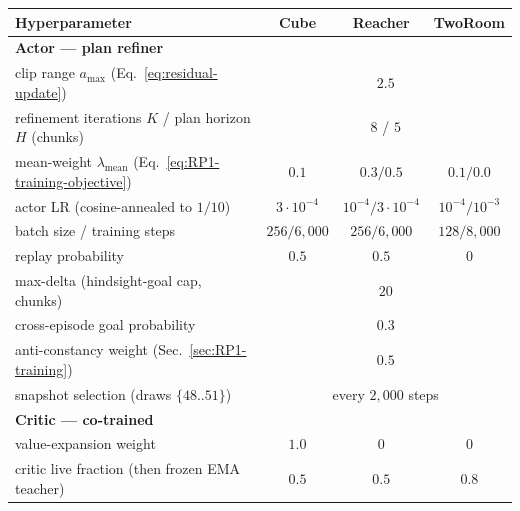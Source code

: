 \begin{table}[H]
\centering
\footnotesize
\renewcommand{\arraystretch}{1.22}
\setlength{\tabcolsep}{7pt}
\begin{tabular}{@{}l@{\hspace{1.5em}}ccc@{}}
\toprule
\textbf{Hyperparameter} & \textbf{Cube} & \textbf{Reacher} & \textbf{TwoRoom}\\
\midrule
\textbf{Actor --- plan refiner}\\
clip range $a_{\max}$ (Eq.~\ref{eq:residual-update})       & \multicolumn{3}{c}{$2.5$}\\
refinement iterations $K$ / plan horizon $H$ (chunks)      & \multicolumn{3}{c}{$8$ / $5$}\\
mean-weight $\lambda_{\mathrm{mean}}$ (Eq.~\ref{eq:RP1-training-objective}) & $0.1$ & $0.3/0.5$ & $0.1/0.0$\\
actor LR (cosine-annealed to $1/10$)                       & $3{\cdot}10^{-4}$ & $10^{-4}/3{\cdot}10^{-4}$ & $10^{-4}/10^{-3}$\\
batch size / training steps                                & $256/6{,}000$ & $256/6{,}000$ & $128/8{,}000$\\
replay probability                                         & $0.5$ & $0.5$ & $0$\\
max-delta (hindsight-goal cap, chunks)                     & \multicolumn{3}{c}{$20$}\\
cross-episode goal probability                             & \multicolumn{3}{c}{$0.3$}\\
anti-constancy weight (Sec.~\ref{sec:RP1-training})        & \multicolumn{3}{c}{$0.5$}\\
snapshot selection (draws $\{48..51\}$)                    & \multicolumn{3}{c}{every $2{,}000$ steps}\\
\addlinespace[3pt]
\textbf{Critic --- co-trained}\\
value-expansion weight                                     & $1.0$ & $0$ & $0$\\
critic live fraction (then frozen EMA teacher)             & $0.5$ & $0.5$ & $0.8$\\

\end{tabular}
\end{table}
